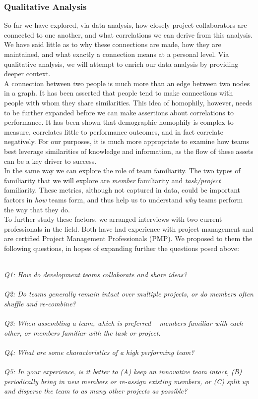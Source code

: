 \documentclass{proc}
\begin{document}
\subsubsection{Qualitative Analysis}
So far we have explored, via data analysis, how closely project collaborators are connected to one another, and what correlations we can derive from this analysis. We have said little as to why these connections are made, how they are maintained, and what exactly a connection means at a personal level. Via qualitative analysis, we will attempt to enrich our data analysis by providing deeper context.\\
A connection between two people is much more than an edge between two nodes in a graph. It has been asserted that people tend to make connections with people with whom they share similarities\cite{mcpherson2001birds}. This idea of homophily, however, needs to be further expanded before we can make assertions about correlations to performance. It has been shown that demographic homophily is complex to measure, correlates little to performance outcomes, and in fact correlate negatively\cite{reagans2004make,lawrence1997perspective}. For our purposes, it is much more appropriate to examine how teams best leverage similarities of knowledge and information, as the flow of these assets can be a key driver to success\cite{nissen2002extended}.\\
In the same way we can explore the role of team familiarity. The two types of familiarity that we will explore are \textit{member} familiarity and \textit{task/project} familiarity\cite{harrison2003time}. These metrics, although not captured in data, could be important factors in \textit{how} teams form, and thus help us to understand \textit{why} teams perform the way that they do.\\

To further study these factors, we arranged interviews with two current professionals in the field. Both have had experience with project management and are certified Project Management Professionals (PMP)\textregistered. We proposed to them the following questions, in hopes of expanding further the questions posed above:

\noindent\\\textit{Q1: How do development teams collaborate and share ideas?}\\
\noindent\\\textit{Q2: Do teams generally remain intact over multiple projects, or do members often shuffle and re-combine?}\\
\noindent\\\textit{Q3: When assembling a team, which is preferred -- members familiar with each other, or members familiar with the task or project.}\\
\noindent\\\textit{Q4: What are some characteristics of a high performing team?}\\
\noindent\\\textit{Q5: In your experience, is it better to (A) keep an innovative team intact, (B) periodically bring in new members or re-assign existing members, or (C) split up and disperse the team to as many other projects as possible?}\\
\end{document}
